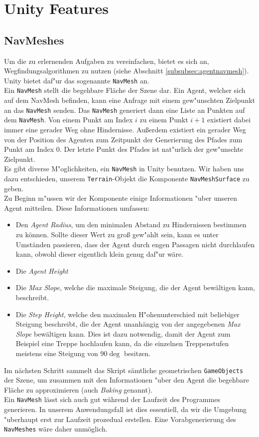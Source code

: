 \section{Unity Features}

\subsection{NavMeshes}

Um die zu erlernenden Aufgaben zu vereinfachen, bietet es sich an, Wegfindungsalgorithmen zu nutzen (siehe Abschnitt \ref{subsubsec:agentnavmesh}). Unity bietet daf"ur das sogenannte \texttt{NavMesh} an.
\\
Ein \texttt{NavMesh} stellt die begehbare Fläche der Szene dar. Ein Agent, welcher sich auf dem NavMesh befinden, kann eine Anfrage mit einem gew"unschten Zielpunkt an das \texttt{NavMesh} senden. Das \texttt{NavMesh} generiert dann eine Liste an Punkten auf dem \texttt{NavMesh}. Von einem Punkt am Index $i$ zu einem Punkt $i+1$ existiert dabei immer eine gerader Weg ohne Hindernisse. Außerdem existiert ein gerader Weg von der Position des Agenten zum Zeitpunkt der Generierung des Pfades zum Punkt am Index $0$. Der letzte Punkt des Pfades ist nat"urlich der gew"unschte Zielpunkt.
\\
Es gibt diverse M"oglichkeiten, ein \texttt{NavMesh} in Unity benutzen. Wir haben uns dazu entschieden, unserem \texttt{Terrain}-Objekt die Komponente \texttt{NavMeshSurface} zu geben.
\\
Zu Beginn m"ussen wir der Komponente einige Informationen "uber unseren Agent mitteilen. Diese Informationen umfassen:
\begin{itemize}
	\item Den \textit{Agent Radius}, um den minimalen Abstand zu Hindernissen bestimmen zu können. Sollte dieser Wert zu groß gew"ahlt sein, kann es unter Umständen passieren, dass der Agent durch engen Passagen nicht durchlaufen kann, obwohl dieser eigentlich klein genug daf"ur wäre.
	\item Die \textit{Agent Height}
	\item Die \textit{Max Slope}, welche die maximale Steigung, die der Agent bewältigen kann, beschreibt.
	\item Die \textit{Step Height}, welche den maximalen H"ohenunterschied mit beliebiger Steigung beschreibt, die der Agent unanhängig von der angegebenen \textit{Max Slope} bewältigen kann. Dies ist dazu notwendig, damit der Agent zum Beispiel eine Treppe hochlaufen kann, da die einzelnen Treppenstufen meistens eine Steigung von $90\deg$ besitzen.
\end{itemize}
Im nächsten Schritt sammelt das Skript sämtliche geometrischen \texttt{GameObjects} der Szene, um zusammen mit den Informationen "uber den Agent die begehbare Fläche zu approximieren (auch \textit{Baking} genannt).
\\
Ein \texttt{NavMesh} lässt sich auch gut während der Laufzeit des Programmes generieren. In unserem Anwendungsfall ist dies essentiell, da wir die Umgebung "uberhaupt erst zur Laufzeit prozedual erstellen. Eine Vorabgenerierung des \texttt{NavMeshes} wäre daher unmöglich.
